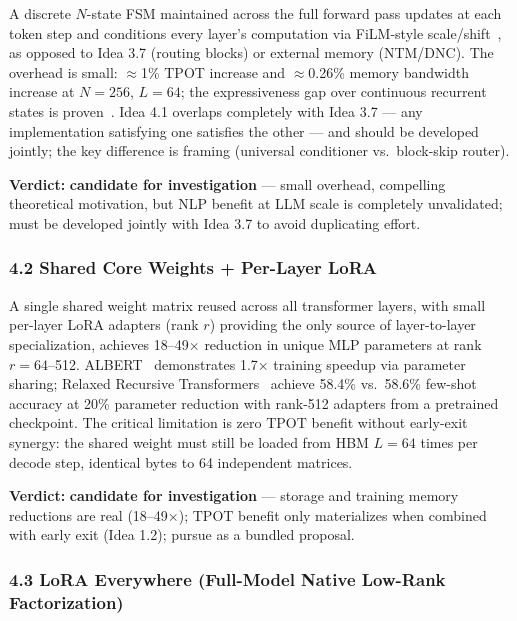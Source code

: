 \documentclass[11pt]{article}
\begin{document}
A discrete $N$-state FSM maintained across the full forward pass updates at each token step and conditions every layer's computation via FiLM-style scale/shift~\cite{Perez2018FiLM}, as opposed to Idea 3.7 (routing blocks) or external memory (NTM/DNC).
The overhead is small: $\approx$1\% TPOT increase and $\approx$0.26\% memory bandwidth increase at $N = 256$, $L = 64$; the expressiveness gap over continuous recurrent states is proven~\cite{Merrill2024Expressiveness}.
Idea 4.1 overlaps completely with Idea 3.7 --- any implementation satisfying one satisfies the other --- and should be developed jointly; the key difference is framing (universal conditioner vs.\ block-skip router).

\textbf{Verdict:} \textbf{candidate for investigation} --- small overhead, compelling theoretical motivation, but NLP benefit at LLM scale is completely unvalidated; must be developed jointly with Idea 3.7 to avoid duplicating effort.

\subsubsection{4.2 Shared Core Weights + Per-Layer LoRA}
\label{sec:idea_4_2}

A single shared weight matrix reused across all transformer layers, with small per-layer LoRA adapters (rank $r$) providing the only source of layer-to-layer specialization, achieves 18--49$\times$ reduction in unique MLP parameters at rank $r = 64$--512.
ALBERT~\cite{Lan2020ALBERT} demonstrates 1.7$\times$ training speedup via parameter sharing; Relaxed Recursive Transformers~\cite{Bae2025RelaxedRecursive} achieve 58.4\% vs.\ 58.6\% few-shot accuracy at 20\% parameter reduction with rank-512 adapters from a pretrained checkpoint.
The critical limitation is zero TPOT benefit without early-exit synergy: the shared weight must still be loaded from HBM $L = 64$ times per decode step, identical bytes to 64 independent matrices.

\textbf{Verdict:} \textbf{candidate for investigation} --- storage and training memory reductions are real (18--49$\times$); TPOT benefit only materializes when combined with early exit (Idea 1.2); pursue as a bundled proposal.

\subsubsection{4.3 LoRA Everywhere (Full-Model Native Low-Rank Factorization)}
\label{sec:idea_4_3}
\end{document}
